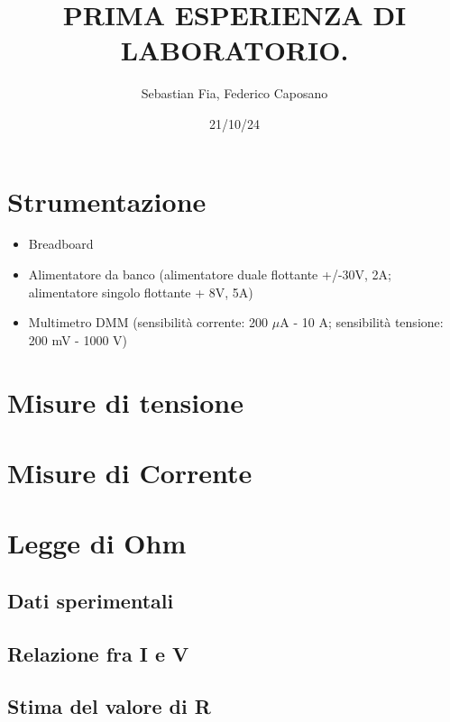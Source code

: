 \documentclass{article}
\title{PRIMA ESPERIENZA DI LABORATORIO.
}
\author{Sebastian Fia, Federico Caposano}
\date{21/10/24}
\begin{document}
	
	\maketitle   %
	
	\section{Strumentazione} \label{sec:Strumentazione}
	 	\begin{itemize} 
	 		\item Breadboard
	 		\item Alimentatore da banco (alimentatore duale flottante +/-30V, 2A; alimentatore singolo flottante + 8V, 5A)
	 		\item Multimetro DMM (sensibilità corrente: 200 $\mu$A - 10 A; sensibilità tensione: 200 mV - 1000 V)
	 	\end{itemize}
	
	\section{Misure di tensione} \label{sec:Tensione}
	\section{Misure di Corrente} \label{sec:Corrente}
	
	
	
	\section{Legge di Ohm} \label{sec:Ohm}
	\subsection{Dati sperimentali}
	\subsection{Relazione fra I e V}
	\subsection{Stima del valore di R}
	
\end{document}

